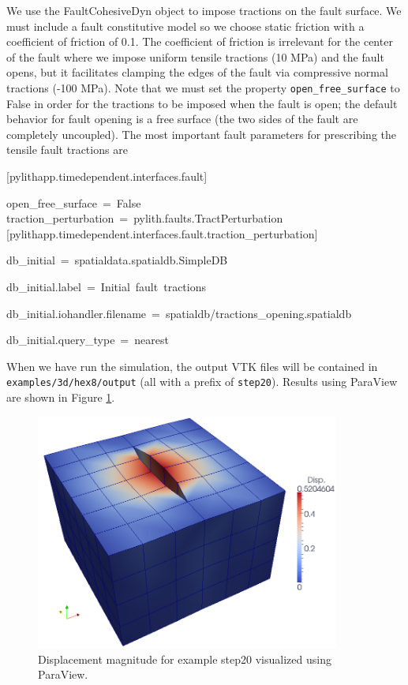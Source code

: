 We use the FaultCohesiveDyn object to impose tractions on the fault
surface. We must include a fault constitutive model so we choose static
friction with a coefficient of friction of 0.1. The coefficient of
friction is irrelevant for the center of the fault where we impose
uniform tensile tractions (10 MPa) and the fault opens, but it facilitates
clamping the edges of the fault via compressive normal tractions (-100
MPa). Note that we must set the property \texttt{open\_free\_surface}
to False in order for the tractions to be imposed when the fault is
open; the default behavior for fault opening is a free surface (the
two sides of the fault are completely uncoupled). The most important
fault parameters for prescribing the tensile fault tractions are
\begin{lyxcode}
{[}pylithapp.timedependent.interfaces.fault{]}

open\_free\_surface~=~False~\\


traction\_perturbation~=~pylith.faults.TractPerturbation~\\


{[}pylithapp.timedependent.interfaces.fault.traction\_perturbation{]}

db\_initial~=~spatialdata.spatialdb.SimpleDB

db\_initial.label~=~Initial~fault~tractions

db\_initial.iohandler.filename~=~spatialdb/tractions\_opening.spatialdb

db\_initial.query\_type~=~nearest~
\end{lyxcode}
When we have run the simulation, the output VTK files will be contained
in \texttt{examples/3d/hex8/output} (all with a prefix of \texttt{step20}).
Results using ParaView are shown in Figure \ref{fig:step20-disp}.

\begin{figure}
\begin{centering}
\includegraphics[width=10cm]{tutorials/3dhex8/figs/step20_disp}
\par\end{centering}

\caption{Displacement magnitude for example step20 visualized using ParaView.
\label{fig:step20-disp}}
\end{figure}

